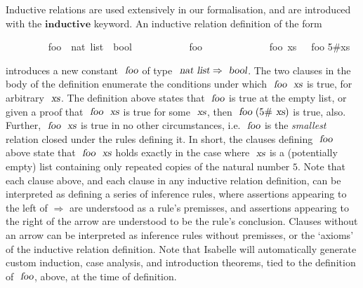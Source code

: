 \documentclass[acmlarge,review,anonymous]{acmart}\settopmatter{printfolios=true}
\begin{document}
Inductive relations are used extensively in our formalisation, and are introduced with the $\mathbf{inductive}$ keyword.
An inductive relation definition of the form
\\
\begin{isabellebody}
\ \ \ \ \ \ \ \  foo\ {\isacharcolon}{\isacharcolon}\ {\isachardoublequoteopen}nat\ list\ {\isasymRightarrow}\ bool{\isachardoublequoteclose}\ \isanewline
\ \ \ \ \ \ \ \ \ \ {\isachardoublequoteopen}foo\ {\isacharbrackleft}{\isacharbrackright}{\isachardoublequoteclose}\ {\isacharbar}\isanewline
\ \ \ \ \ \ \ \ \ \ {\isachardoublequoteopen}{\isasymlbrakk}\ foo\ xs\ {\isasymrbrakk}\ {\isasymLongrightarrow}\ foo {\isacharparenleft}5\#xs{\isacharparenright}{\isachardoublequoteclose}
\end{isabellebody}
\vspace{\baselineskip}
\noindent
introduces a new constant $\isa{foo}$ of type $\isa{nat list} \Rightarrow \isa{bool}$.
The two clauses in the body of the definition enumerate the conditions under which $\isa{foo}\ \isa{xs}$ is true, for arbitrary $\isa{xs}$.
The definition above states that $\isa{foo}$ is true at the empty list, or given a proof that $\isa{foo}\ \isa{xs}$ is true for some $\isa{xs}$, then $\isa{foo}\ (5\#\isa{xs})$ is true, also.
Further, $\isa{foo}\ \isa{xs}$ is true in no other circumstances, i.e. $\isa{foo}$ is the \emph{smallest} relation closed under the rules defining it.
In short, the clauses defining $\isa{foo}$ above state that $\isa{foo}\ \isa{xs}$ holds exactly in the case where $\isa{xs}$ is a (potentially empty) list containing only repeated copies of the natural number $5$.
Note that each clause above, and each clause in any inductive relation definition, can be interpreted as defining a series of inference rules, where assertions appearing to the left of $\Longrightarrow$ are understood as a rule's premisses, and assertions appearing to the right of the arrow are understood to be the rule's conclusion.
Clauses without an arrow can be interpreted as inference rules without premisses, or the `axioms' of the inductive relation definition.
Note that Isabelle will automatically generate custom induction, case analysis, and introduction theorems, tied to the definition of $\isa{foo}$, above, at the time of definition.
\end{document}
